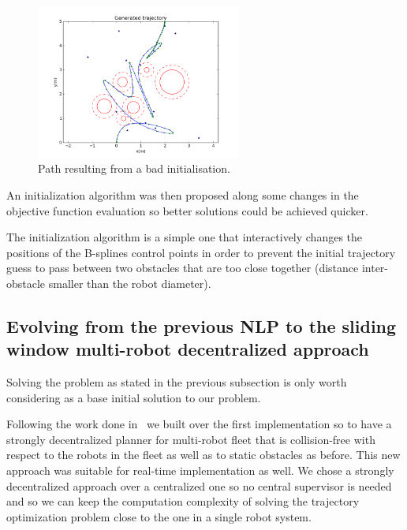 \begin{figure}[!h]
	\centering
	\includegraphics[width=0.6\textwidth]{./images/planning-sim-trajc.png}
	\caption{Path resulting from a bad initialisation.\label{fig:planning-sim-trajc}}
\end{figure}

An initialization algorithm was then proposed along some changes in the objective function evaluation so better solutions could be achieved quicker.

The initialization algorithm is a simple one that interactively changes the positions of the B-splines control points in order to prevent the initial trajectory guess to pass between two obstacles that are too close together (distance inter-obstacle smaller than the robot diameter).

\subsection{Evolving from the previous NLP to the sliding window multi-robot decentralized approach}

Solving the problem as stated in the previous subsection is only worth considering as a base initial solution to our problem.

Following the work done in~\cite{Defoort2007a} we built over the first implementation so to have a strongly decentralized planner for multi-robot fleet that is collision-free with respect to the robots in the fleet as well as to static obstacles as before. This new approach was suitable for real-time implementation as well. We chose a strongly decentralized approach over a centralized one so no central supervisor is needed and so we can keep the computation complexity of solving the trajectory optimization problem close to the one in a single robot system.

